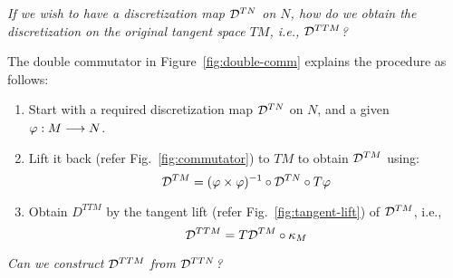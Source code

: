 \textit{If we wish to have a discretization map $\mathcal{D}^{TN}$ on $N$, how do we obtain the discretization on the original tangent space $TM$, i.e., $\mathcal{D}^{TTM}$?}

The double commutator in Figure~\ref{fig:double-comm} explains the procedure as follows:

\begin{enumerate}
  \item Start with a required discretization map $\mathcal{D}^{TN}$ on $N$, and a given $\varphi: M \longrightarrow N$.
  \item Lift it back (refer Fig.~\ref{fig:commutator}) to $TM$ to obtain $\mathcal{D}^{TM}$ using: \[\mathcal{D}^{TM} = (\varphi \times \varphi)^{-1} \circ \mathcal{D}^{TN} \circ T\varphi\] 
  \item Obtain $D^{TTM}$ by the tangent lift (refer Fig.~\ref{fig:tangent-lift}) of $\mathcal{D}^{TM}$, i.e., \[\mathcal{D}^{TTM} = T\mathcal{D}^{TM} \circ \kappa_M\]
\end{enumerate}

\textit{Can we construct $\mathcal{D}^{TTM}$ from $\mathcal{D}^{TTN}$?}

